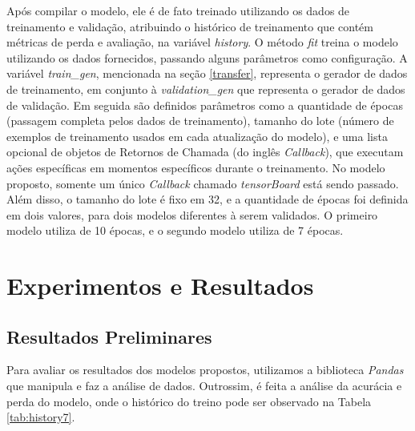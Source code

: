 Após compilar o modelo, ele é de fato treinado utilizando os dados de treinamento e validação, atribuindo o histórico de treinamento que contém métricas de perda e avaliação, na variável \textit{history}. O método \textit{fit} treina o modelo utilizando os dados fornecidos, passando alguns parâmetros como configuração. A variável \textit{train\_gen}, mencionada na seção \ref{transfer}, representa o gerador de dados de treinamento, em conjunto à \textit{validation\_gen} que representa o gerador de dados de validação. Em seguida são definidos parâmetros como a quantidade de épocas (passagem completa pelos dados de treinamento), tamanho do lote (número de exemplos de treinamento usados em cada atualização do modelo), e uma lista opcional de objetos de Retornos de Chamada (do inglês \textit{Callback}), que executam ações específicas em momentos específicos durante o treinamento. No modelo proposto, somente um único \textit{Callback} chamado \textit{tensorBoard} está sendo passado. Além disso, o tamanho do lote é fixo em 32, e a quantidade de épocas foi definida em dois valores, para dois modelos diferentes à serem validados. O primeiro modelo utiliza de 10 épocas, e o segundo modelo utiliza de 7 épocas.



\section{\esp Experimentos e Resultados} \label{results}



\subsection{\esp Resultados Preliminares} \label{prelim}

Para avaliar os resultados dos modelos propostos, utilizamos a biblioteca \textit{Pandas} que manipula e faz a análise de dados. Outrossim, é feita a análise da acurácia e perda do modelo, onde o histórico do treino pode ser observado na Tabela \ref{tab:history7}.

